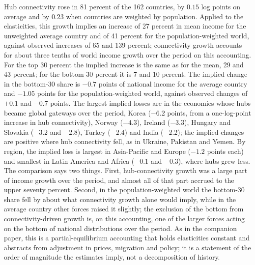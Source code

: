 Hub connectivity rose in 81 percent of the 162 countries, by $0.15$ log points on average and by $0.23$ when countries are weighted by population. Applied to the elasticities, this growth implies an increase of 27 percent in mean income for the unweighted average country and of 41 percent for the population-weighted world, against observed increases of 65 and 139 percent; connectivity growth accounts for about three tenths of world income growth over the period on this accounting. For the top 30 percent the implied increase is the same as for the mean, 29 and 43 percent; for the bottom 30 percent it is 7 and 10 percent. The implied change in the bottom-30 share is $-0.7$ points of national income for the average country and $-1.05$ points for the population-weighted world, against observed changes of $+0.1$ and $-0.7$ points. The largest implied losses are in the economies whose hubs became global gateways over the period, Korea ($-6.2$ points, from a one-log-point increase in hub connectivity), Norway ($-4.3$), Ireland ($-3.3$), Hungary and Slovakia ($-3.2$ and $-2.8$), Turkey ($-2.4$) and India ($-2.2$); the implied changes are positive where hub connectivity fell, as in Ukraine, Pakistan and Yemen. By region, the implied loss is largest in Asia-Pacific and Europe ($-1.2$ points each) and smallest in Latin America and Africa ($-0.1$ and $-0.3$), where hubs grew less. The comparison says two things. First, hub-connectivity growth was a large part of income growth over the period, and almost all of that part accrued to the upper seventy percent. Second, in the population-weighted world the bottom-30 share fell by about what connectivity growth alone would imply, while in the average country other forces raised it slightly; the exclusion of the bottom from connectivity-driven growth is, on this accounting, one of the larger forces acting on the bottom of national distributions over the period. As in the companion paper, this is a partial-equilibrium accounting that holds elasticities constant and abstracts from adjustment in prices, migration and policy; it is a statement of the order of magnitude the estimates imply, not a decomposition of history.

